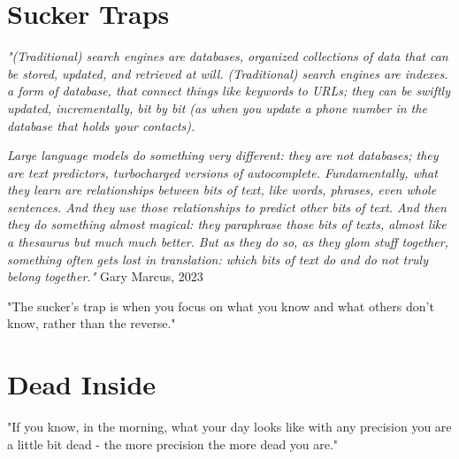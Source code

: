 \section{Sucker Traps}

\textit{"(Traditional) search engines are databases, organized collections of data that can be stored, updated, and retrieved at will. (Traditional) search engines are indexes. a form of database, that connect things like keywords to URLs; they can be swiftly updated, incrementally, bit by bit (as when you update a phone number in the database that holds your contacts).}

\textit{Large language models do something very different: they are not databases; they are text predictors, turbocharged versions of autocomplete. Fundamentally, what they learn are relationships between bits of text, like words, phrases, even whole sentences. And they use those relationships to predict other bits of text. And then they do something almost magical: they paraphrase those bits of texts, almost like a thesaurus but much much better. But as they do so, as they glom stuff together, something often gets lost in translation: which bits of text do and do not truly belong together."} Gary Marcus, 2023 \cite{marcus2023}

"The sucker's trap is when you focus on what you know and what others don't know, rather than the reverse."

\section{Dead Inside}

"If you know, in the morning, what your day looks like with any precision you are a little bit dead - the more precision the more dead you are."
